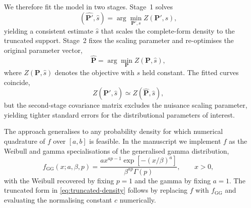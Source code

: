 We therefore fit the model in two stages. Stage~1 solves
\begin{equation}
  (\widehat{\bm{P}'}, \hat{s}) = \arg\min_{\bm{P}', s} Z(\bm{P}', s),
\end{equation}
yielding a consistent estimate $\hat{s}$ that scales the complete-form density to the truncated support. Stage~2 fixes the scaling parameter and re-optimises the original parameter vector,
\begin{equation}
  \widehat{\bm{P}} = \arg\min_{\bm{P}} Z(\bm{P}, \hat{s}),
\end{equation}
where $Z(\bm{P}, \hat{s})$ denotes the objective with $s$ held constant. The fitted curves coincide,
\begin{equation}
  Z(\widehat{\bm{P}'}, \hat{s}) \simeq Z(\widehat{\bm{P}}, \hat{s}),
\end{equation}
but the second-stage covariance matrix excludes the nuisance scaling parameter, yielding tighter standard errors for the distributional parameters of interest.

The approach generalises to any probability density for which numerical quadrature of $f$ over $[a, b]$ is feasible. In the manuscript we implement $f$ as the Weibull and gamma specialisations of the generalised gamma distribution,
\begin{equation}
  f_{\mathrm{GG}}(x; a, \beta, p) = \frac{a x^{ap - 1} \exp\left[-(x / \beta)^a\right]}{\beta^{ap} \Gamma(p)}, \qquad x > 0,
\end{equation}
with the Weibull recovered by fixing $p = 1$ and the gamma by fixing $a = 1$. The truncated form in \eqref{eq:truncated-density} follows by replacing $f$ with $f_{\mathrm{GG}}$ and evaluating the normalising constant $c$ numerically.

